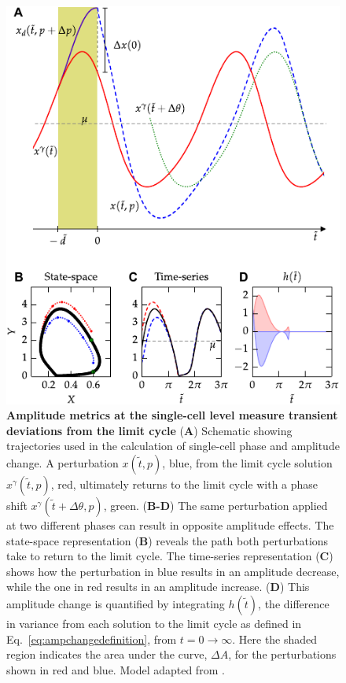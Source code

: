 \documentclass[11pt, letterpaper]{article}
\begin{document}
\begin{figure}[tbp]
  \begin{center}
    \includegraphics[width=.75\textwidth]{figures/figure_1.pdf}
  \end{center}
  \caption{
{\bfseries Amplitude metrics at the single-cell level measure transient deviations from the limit cycle} ({\bfseries A}) Schematic showing trajectories used in the calculation of single-cell phase and amplitude change.
A perturbation $x(\tilde{t},p)$, blue, from the limit cycle solution $x^\gamma(\tilde{t},p)$, red, ultimately returns to the limit cycle with a phase shift $x^\gamma(\tilde{t} + \Delta\theta,p)$, green.
({\bfseries B-D}) The same perturbation applied at two different phases can result in opposite amplitude effects.
The state-space representation ({\bfseries B}) reveals the path both perturbations take to return to the limit cycle.
The time-series representation ({\bfseries C}) shows how the perturbation in blue results in an amplitude decrease, while the one in red results in an amplitude increase.
({\bfseries D}) This amplitude change is quantified by integrating $h(\tilde{t})$, the difference in variance from each solution to the limit cycle as defined in Eq.~\ref{eq:ampchangedefinition}, from $t=0 \to \infty$.
Here the shaded region indicates the area under the curve, $\Delta A$, for the perturbations shown in red and blue.
Model adapted from \cite{Novak2008}.
} \end{figure}
\end{document}
